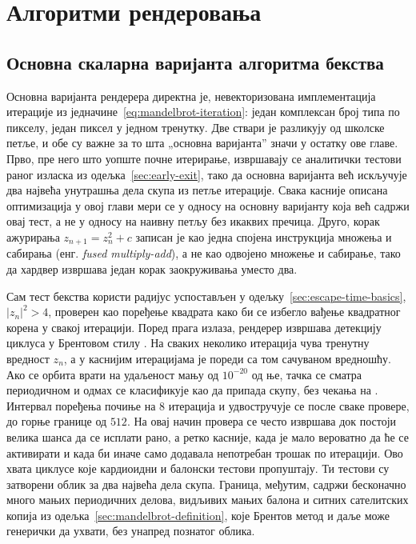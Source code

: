 \documentclass[serbian]{ftndiplomski}
\begin{document}
\chapter{Алгоритми рендеровања}
\label{ch:algorithms}

\section{Основна скаларна варијанта алгоритма бекства}
\label{sec:baseline-scalar}

Основна варијанта рендерера директна је, невекторизована имплементација итерације из
једначине~\ref{eq:mandelbrot-iteration}: један комплексан број типа  по
пикселу, један пиксел у једном тренутку. Две ствари је разликују од школске петље, и
обе су важне за то шта „основна варијанта'' значи у остатку ове главе. Прво, пре него
што уопште почне итерирање, извршавају се аналитички тестови раног изласка из
одељка~\ref{sec:early-exit}, тако да основна варијанта већ искључује два највећа
унутрашња дела скупа из петље итерације. Свака касније описана оптимизација у овој
глави мери се у односу на основну варијанту која већ садржи овај тест, а не у односу на
наивну петљу без икаквих пречица. Друго, корак ажурирања $z_{n+1} = z_n^2 + c$ записан
је као једна спојена инструкција множења и сабирања (енг. \emph{fused multiply-add}), а не
као одвојено множење и сабирање, тако да хардвер извршава један корак заокруживања
уместо два.

Сам тест бекства користи радијус успостављен у одељку~\ref{sec:escape-time-basics},
$|z_n|^2 > 4$, проверен као поређење квадрата како би се избегло вађење квадратног
корена у свакој итерацији. Поред прага излаза, рендерер извршава детекцију циклуса у
Брентовом стилу \cite{brent1980}. На сваких неколико итерација чува тренутну вредност
$z_n$, а у каснијим итерацијама је пореди са том сачуваном вредношћу. Ако се орбита
врати на удаљеност мању од $10^{-20}$ од ње, тачка се сматра периодичном и одмах се
класификује као да припада скупу, без чекања на . Интервал поређења
почиње на $8$ итерација и удвостручује се после сваке провере, до горње границе од
$512$. На овај начин провера се често извршава док постоји велика шанса да се исплати
рано, а ретко касније, када је мало вероватно да ће се активирати и када би иначе само
додавала непотребан трошак по итерацији. Ово хвата циклусе које кардиоидни и балонски
тестови пропуштају. Ти тестови су затворени облик за два највећа дела скупа. Граница,
међутим, садржи бесконачно много мањих периодичних делова, видљивих мањих балона и
ситних сателитских копија из одељка~\ref{sec:mandelbrot-definition}, које Брентов
метод и даље може генерички да ухвати, без унапред познатог облика.
\end{document}
